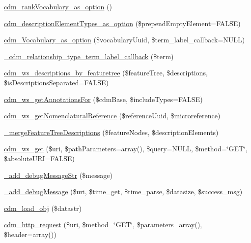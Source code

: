 \begin{DoxyCompactItemize}
\item 
\hyperlink{cdm__api_8module_a794e5ac8b950ba9abd5970d3d5afd535}{cdm\-\_\-rank\-Vocabulary\-\_\-as\-\_\-option} ()
\item 
\hyperlink{cdm__api_8module_a04b403d3066b2705433b4f6fff065d30}{cdm\-\_\-description\-Element\-Types\-\_\-as\-\_\-option} (\$prepend\-Empty\-Element=F\-A\-L\-S\-E)
\item 
\hyperlink{cdm__api_8module_af45890cc79e537b562e586872c73b9f4}{cdm\-\_\-\-Vocabulary\-\_\-as\-\_\-option} (\$vocabulary\-Uuid, \$term\-\_\-label\-\_\-callback=N\-U\-L\-L)
\item 
\hyperlink{cdm__api_8module_a6a8a14a40aa7da80e6e0b6b628030120}{\-\_\-cdm\-\_\-relationship\-\_\-type\-\_\-term\-\_\-label\-\_\-callback} (\$term)
\item 
\hyperlink{cdm__api_8module_a7877c016a87912823f3035f3ac4fe2f4}{cdm\-\_\-ws\-\_\-descriptions\-\_\-by\-\_\-featuretree} (\$feature\-Tree, \$descriptions, \$is\-Descriptions\-Separated=F\-A\-L\-S\-E)
\item 
\hyperlink{cdm__api_8module_a8716cc45c435459110c0b0e0b6746ca2}{cdm\-\_\-ws\-\_\-get\-Annotations\-For} (\$cdm\-Base, \$include\-Types=F\-A\-L\-S\-E)
\item 
\hyperlink{cdm__api_8module_acb6bf6d82d3f019aac66ce9acef673b0}{cdm\-\_\-ws\-\_\-get\-Nomenclatural\-Reference} (\$reference\-Uuid, \$microreference)
\item 
\hyperlink{cdm__api_8module_aed97a9ebcb792471fcfefc68f4f593da}{\-\_\-merge\-Feature\-Tree\-Descriptions} (\$feature\-Nodes, \$description\-Elements)
\item 
\hyperlink{cdm__api_8module_ae530a4d0b58bbbbc01ce74343a4a6248}{cdm\-\_\-ws\-\_\-get} (\$uri, \$path\-Parameters=array(), \$query=N\-U\-L\-L, \$method=\char`\"{}G\-E\-T\char`\"{}, \$absolute\-U\-R\-I=F\-A\-L\-S\-E)
\item 
\hyperlink{cdm__api_8module_a9f5f539b196c4145d4fc78a1aa120713}{\-\_\-add\-\_\-debug\-Message\-Str} (\$message)
\item 
\hyperlink{cdm__api_8module_a282745dfeded9d1840386c9aa6afe90e}{\-\_\-add\-\_\-debug\-Message} (\$uri, \$time\-\_\-get, \$time\-\_\-parse, \$datasize, \$success\-\_\-msg)
\item 
\hyperlink{cdm__api_8module_a10336309af9e9112c8a6d852dc3c3de2}{cdm\-\_\-load\-\_\-obj} (\$datastr)
\item 
\hyperlink{cdm__api_8module_aca1b568f457f7a8699eb335409e0d719}{cdm\-\_\-http\-\_\-request} (\$uri, \$method=\char`\"{}G\-E\-T\char`\"{}, \$parameters=array(), \$header=array())

\end{DoxyCompactItemize}
